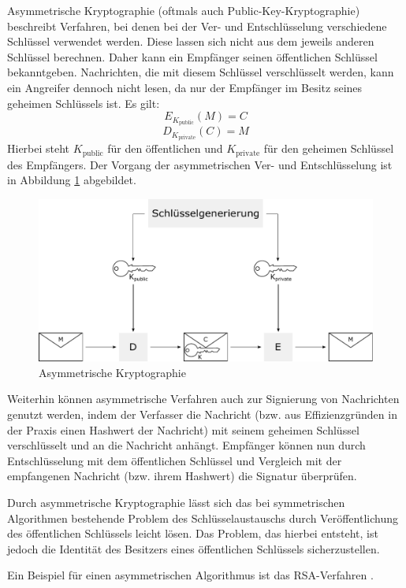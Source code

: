 Asymmetrische Kryptographie (oftmals auch Public-Key-Kryptographie) beschreibt Verfahren, bei denen bei der Ver- und Entschlüsselung verschiedene Schlüssel verwendet werden. Diese lassen sich nicht aus dem jeweils anderen Schlüssel berechnen. Daher kann ein Empfänger seinen öffentlichen Schlüssel bekanntgeben. Nachrichten, die mit diesem Schlüssel verschlüsselt werden, kann ein Angreifer dennoch nicht lesen, da nur der Empfänger im Besitz seines geheimen Schlüssels ist. Es gilt: 
\[E_{K_{\text{public}}}(M)=C\] 
\[D_{K_{\text{private}}}(C)=M\] 
Hierbei steht \(K_{\text{public}}\) für den öffentlichen und \(K_{\text{private}}\) für den geheimen Schlüssel des Empfängers. Der Vorgang der asymmetrischen Ver- und Entschlüsselung ist in Abbildung \ref{fig_asymmetric_encryption} abgebildet.

\begin{figure}
	\centering
	\includegraphics[width=15cm]{Diagrams/AsymmetricEncryption.pdf} %
	\caption{Asymmetrische Kryptographie}
	\label{fig_asymmetric_encryption}
\end{figure}

Weiterhin können asymmetrische Verfahren auch zur Signierung von Nachrichten genutzt werden, indem der Verfasser die Nachricht (bzw. aus Effizienzgründen in der Praxis einen Hashwert der Nachricht) mit seinem geheimen Schlüssel verschlüsselt und an die Nachricht anhängt. Empfänger können nun durch Entschlüsselung mit dem öffentlichen Schlüssel und Vergleich mit der empfangenen Nachricht (bzw. ihrem Hashwert) die Signatur überprüfen.

Durch asymmetrische Kryptographie lässt sich das bei symmetrischen Algorithmen bestehende Problem des Schlüsselaustauschs durch Veröffentlichung des öffentlichen Schlüssels leicht lösen. Das Problem, das hierbei entsteht, ist jedoch die Identität des Besitzers eines öffentlichen Schlüssels sicherzustellen.

Ein Beispiel für einen asymmetrischen Algorithmus ist das RSA-Verfahren \cite{Schneier2006}.

